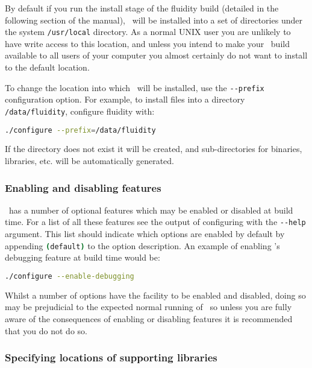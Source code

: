 By default if you run the install stage of the fluidity build (detailed in the
following section of the manual), \fluidity\ will be installed into a set of
directories under the system \lstinline[language=Bash]+/usr/local+ directory.
As a normal UNIX user you are unlikely to have write access to this location,
and unless you intend to make your \fluidity\ build available to all users of
your computer you almost certainly do not want to install to the default
location.

To change the location into which \fluidity\ will be installed, use the
\lstinline[language=Bash]+--prefix+ configuration option. For example, to
install files into a directory \lstinline[language=Bash]+/data/fluidity+,
configure fluidity with:

\begin{lstlisting}[language=Bash]
./configure --prefix=/data/fluidity
\end{lstlisting}

If the directory does not exist it will be created, and sub-directories for
binaries, libraries, etc. will be automatically generated.

\subsubsection{Enabling and disabling features}
\label{sect:configure_enable_disable_features}

\fluidity\ has a number of optional features which may be enabled or disabled at
build time. For a list of all these features see the output of configuring with
the \lstinline[language=Bash]+--help+ argument. This list should indicate which
options are enabled by default by appending
\lstinline[language=Bash]+(default)+ to the option description. An example of
enabling \fluidity's debugging feature at build time would be:

\begin{lstlisting}[language=Bash]
./configure --enable-debugging
\end{lstlisting}

Whilst a number of options have the facility to be enabled and disabled, doing
so may be prejudicial to the expected normal running of \fluidity\ so unless you
are fully aware of the consequences of enabling or disabling features it is
recommended that you do not do so.

\subsubsection{Specifying locations of supporting libraries}
\label{sect:configure_locate_supporting_libs}

